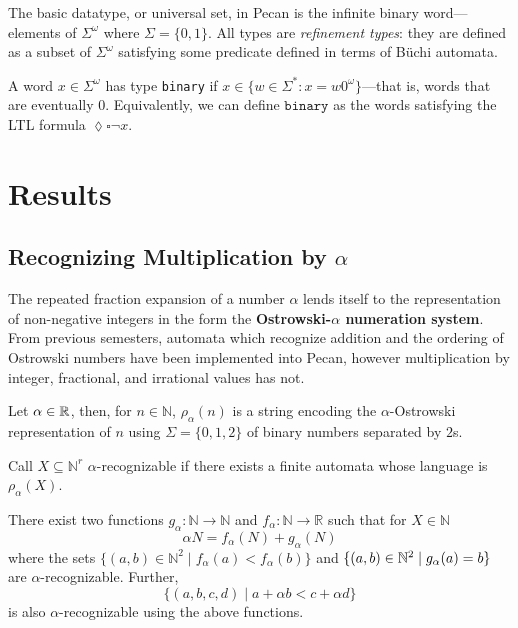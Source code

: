 \documentclass[10pt,usenames,dvipsnames]{article}
\begin{document}
The basic datatype, or universal set, in Pecan is the infinite binary word---elements of $\Sigma^{\omega}$ where $\Sigma = \{0,1\}$.
All types are \emph{refinement types}: they are defined as a subset of $\Sigma^{\omega}$ satisfying some predicate defined in terms of B\"uchi automata.
\begin{example}
A word $x \in \Sigma^\omega$ has type \texttt{binary} if $x \in \{ w \in \Sigma^* : x = w0^\omega \}$---that is, words that are eventually $0$.
Equivalently, we can define $\texttt{binary}$ as the words satisfying the LTL formula $\lozenge \square \neg x$.
\end{example}

\section{Results}

\subsection{Recognizing Multiplication by $\alpha$}
The repeated fraction expansion of a number $\alpha$ lends itself to the representation of non-negative integers in the form the \textbf{Ostrowski-$\alpha$ numeration system}. From previous semesters, automata which recognize addition and the ordering of Ostrowski numbers have been implemented into Pecan, however multiplication by integer, fractional, and irrational values has not.

\begin{definition}
Let $\alpha \in \mathbb{R}$, then, for $n \in \mathbb N$, $\rho_{\alpha} (n)$ is a string encoding the $\alpha$-Ostrowski representation of $n$ using $\Sigma = \{0,1,2\}$ of binary numbers separated by $2$s.
\end{definition}

\begin{definition}
Call $X \subseteq \mathbb N ^ r$ $\alpha$-recognizable if there exists a finite automata whose language is $\rho_{\alpha} (X)$. %
\end{definition}

\begin{theorem} 
There exist two functions $g_{\alpha}: \mathbb N \to \mathbb N$ and $f_{\alpha}: \mathbb N \to \mathbb R$ such that for $X \in \mathbb N$
$$\alpha N = f_{\alpha} (N) + g_{\alpha} (N)$$
where the sets $\{ (a,b) \in \mathbb N^2 \mid f_{\alpha}(a) < f_{\alpha}(b) \}$ and $\{ (a,b) \in \mathbb{N}^2 \mid g_{\alpha} (a) = b \}$ are $\alpha$-recognizable. Further, 
$$\{ (a,b,c,d) \mid a + \alpha b < c + \alpha d \}$$
is also $\alpha$-recognizable using the above functions.
\end{theorem}
\end{document}
